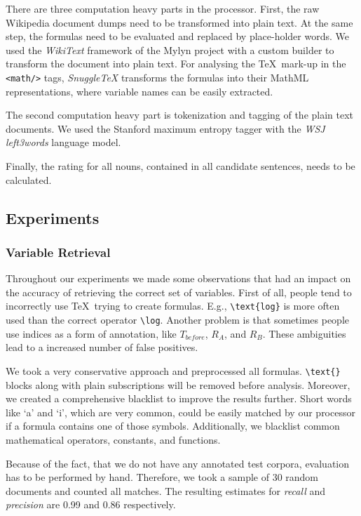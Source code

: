 \documentclass[runningheads]{llncs}
\begin{document}
There are three computation heavy parts in the processor. First, the raw
Wikipedia document dumps need to be transformed into plain text. At the same
step, the formulas need to be evaluated and replaced by place-holder words. We
used the \emph{WikiText} framework of the Mylyn project with a custom builder
to transform the document into plain text. For analysing the \TeX \ mark-up in
the \texttt{<math/>} tags, \emph{SnuggleTeX} transforms the formulas into
their MathML representations, where variable names can be easily extracted.

The second computation heavy part is tokenization and tagging of the plain
text documents. We used the Stanford maximum entropy tagger with the \emph{WSJ
left3words} language model.

Finally, the rating for all nouns, contained in all candidate sentences, needs
to be calculated.


\subsection{Experiments}

\subsubsection{Variable Retrieval}
\label{vr}
Throughout our experiments we made some observations that had an impact on the
accuracy of retrieving the correct set of variables. First of all, people tend
to incorrectly use \TeX\ trying to create formulas. E.g.,
\texttt{\textbackslash text\{log\}} is more often used than the correct
operator \texttt{\textbackslash log}. Another problem is that sometimes people
use indices as a form of annotation, like $T_{before}$, $R_{A}$, and $R_{B}$.
These ambiguities lead to a increased number of false positives.

We took a very conservative approach and preprocessed all formulas.
\texttt{\textbackslash text\{\}} blocks along with plain subscriptions will be
removed before analysis. Moreover, we created a comprehensive blacklist to
improve the results further. Short words like `a' and `i', which are very
common, could be easily matched by our processor if a formula contains one of
those symbols. Additionally, we blacklist common mathematical operators,
constants, and functions.

Because of the fact, that we do not have any annotated test corpora,
evaluation has to be performed by hand. Therefore, we took a sample of 30
random documents and counted all matches. The resulting estimates for
\emph{recall} and \emph{precision} are 0.99 and 0.86 respectively.
\end{document}
